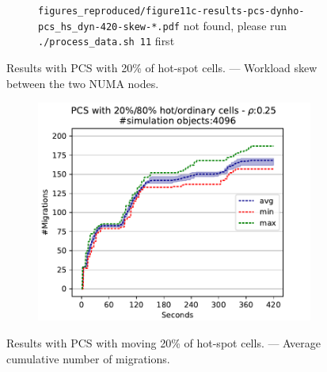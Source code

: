 \documentclass[]{article}
\begin{document}
\begin{figure}[!h]
{}
{
\begin{subfigure}[b]{\mysize}
\centering
\texttt{figures\_reproduced/figure11c-results-pcs-dynho-pcs\_hs\_dyn-420-skew-*.pdf} not found, please run \texttt{./process\_data.sh 11} first
\renewcommand{\thesubfigure}{Reproduced 6}
\caption{}
\end{subfigure}
}

\caption{Results with PCS with 20\% of hot-spot cells. --- Workload skew between the two NUMA nodes.}
\end{figure}






\setcounter{figure}{10}
\renewcommand{\thefigure}{\arabic{figure}d}
\renewcommand{\mysize}{0.2\linewidth}

\begin{figure}[!h]
\centering
\begin{subfigure}[b]{\mysize}
\centering
\includegraphics[width=\linewidth]{figures_original/results-pcs-dyn-0.48-pcs_hs-420-mcnt.pdf}
\renewcommand{\thesubfigure}{Original}
\caption{}
\end{subfigure}
\begin{subfigure}[b]{\mysize}
\centering
{}
\renewcommand{\thesubfigure}{Reproduced}
\caption{}
\end{subfigure}
\caption{Results with PCS with moving 20\% of hot-spot cells. --- Average cumulative number of migrations.}
\end{figure}
\end{document}
